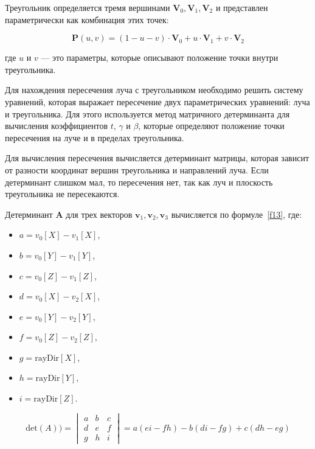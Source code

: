Треугольник определяется тремя вершинами \( \mathbf{V}_0, \mathbf{V}_1, \mathbf{V}_2 \) и представлен параметрически как комбинация этих точек:

\begin{equation}
\mathbf{P}(u, v) = (1 - u - v) \cdot \mathbf{V}_0 + u \cdot \mathbf{V}_1 + v \cdot \mathbf{V}_2
\end{equation}

где \(u\) и \(v\) — это параметры, которые описывают положение точки внутри треугольника.

Для нахождения пересечения луча с треугольником необходимо решить систему уравнений, которая выражает пересечение двух параметрических уравнений: луча и треугольника. Для этого используется метод матричного детерминанта для вычисления коэффициентов \( t \), \( \gamma \) и \( \beta \), которые определяют положение точки пересечения на луче и в пределах треугольника.

Для вычисления пересечения вычисляется детерминант матрицы, которая зависит от разности координат вершин треугольника и направлений луча. Если детерминант слишком мал, то пересечения нет, так как луч и плоскость треугольника не пересекаются.

Детерминант \(\mathbf{A}\) для трех векторов \(\mathbf{v}_1, \mathbf{v}_2, \mathbf{v}_3\) вычисляется по формуле~\ref{f13}, где:
\begin{itemize}
    \item \(a = v_0[X] - v_1[X]\),
    \item \(b = v_0[Y] - v_1[Y]\),
    \item \(c = v_0[Z] - v_1[Z]\),
    \item \(d = v_0[X] - v_2[X]\),
    \item \(e = v_0[Y] - v_2[Y]\),
    \item \(f = v_0[Z] - v_2[Z]\),
    \item \(g = \text{rayDir}[X]\),
    \item \(h = \text{rayDir}[Y]\),
    \item \(i = \text{rayDir}[Z]\).
\end{itemize}

\begin{equation}
\text{det}(A)) = 
\begin{vmatrix}
a & b & c \\
d & e & f \\
g & h & i
\end{vmatrix} = a(ei - fh) - b(di - fg) + c(dh - eg)
\label{f13}
\end{equation}

